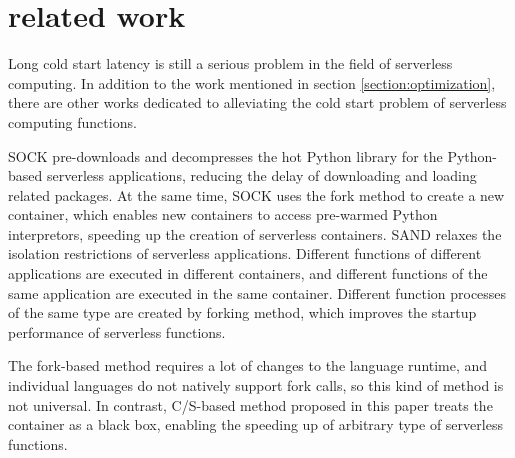 \section{related work}
Long cold start latency is still a
serious problem in the field of serverless computing.
In addition to the work mentioned in section \ref{section:optimization},
there are other works dedicated to alleviating the cold start problem of serverless computing functions.

SOCK\cite{sock} pre-downloads and decompresses the hot
Python library for the Python-based serverless applications,
reducing the delay of downloading and loading related packages.
At the same time,
SOCK uses the fork method to create a new container,
which enables new containers to access pre-warmed Python interpretors, 
speeding up the creation of serverless containers.
SAND\cite{sand} relaxes the isolation restrictions of serverless applications.
Different functions of different applications are executed in different containers,
and different functions of the same application are executed in the same container.
Different function processes of the same type are created by forking method, 
which improves the startup performance of serverless functions.

The fork-based method requires a lot of changes to the language runtime, 
and individual languages do not natively support 
fork calls, so this kind of method is not universal. 
In contrast, 
C/S-based method proposed in this paper treats the container 
as a black box, enabling the speeding up of arbitrary type of 
serverless functions. 